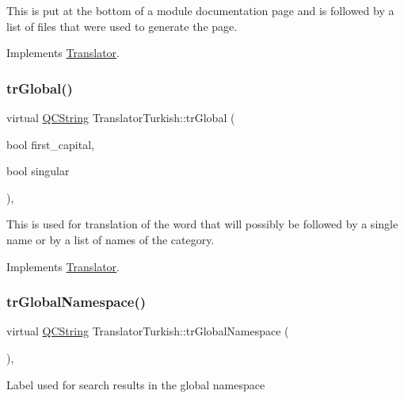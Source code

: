 This is put at the bottom of a module documentation page and is followed by a list of files that were used to generate the page. 

Implements \mbox{\hyperlink{class_translator}{Translator}}.

\mbox{\label{class_translator_turkish_a7d4c642b341cca82edaed8f4991c90ef}} 
\subsubsection{\texorpdfstring{trGlobal()}{trGlobal()}}
{\footnotesize\ttfamily virtual \mbox{\hyperlink{class_q_c_string}{Q\+C\+String}} Translator\+Turkish\+::tr\+Global (\begin{DoxyParamCaption}\item[{bool}]{first\+\_\+capital,  }\item[{bool}]{singular }\end{DoxyParamCaption})\hspace{0.3cm}{\ttfamily [inline]}, {\ttfamily [virtual]}}

This is used for translation of the word that will possibly be followed by a single name or by a list of names of the category. 

Implements \mbox{\hyperlink{class_translator}{Translator}}.

\mbox{\label{class_translator_turkish_ad39723d98618b6290087ca4a2f9fac6d}} 
\subsubsection{\texorpdfstring{trGlobalNamespace()}{trGlobalNamespace()}}
{\footnotesize\ttfamily virtual \mbox{\hyperlink{class_q_c_string}{Q\+C\+String}} Translator\+Turkish\+::tr\+Global\+Namespace (\begin{DoxyParamCaption}{ }\end{DoxyParamCaption})\hspace{0.3cm}{\ttfamily [inline]}, {\ttfamily [virtual]}}

Label used for search results in the global namespace 

